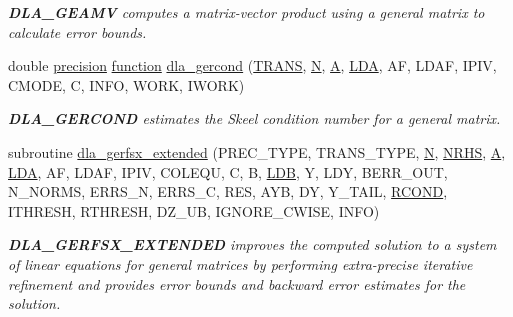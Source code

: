 \begin{DoxyCompactItemize}
\begin{DoxyCompactList}\small\item\em {\bfseries D\+L\+A\+\_\+\+G\+E\+A\+M\+V} computes a matrix-\/vector product using a general matrix to calculate error bounds. \end{DoxyCompactList}\item 
double \hyperlink{numinquire_8h_a2c8e616467665d0b2814d4c1589ba74e}{precision} \hyperlink{afunc_8m_a7b5e596df91eadea6c537c0825e894a7}{function} \hyperlink{group__doubleGEcomputational_ga5539077fbd3a92c4d92b75bf58da5db3}{dla\+\_\+gercond} (\hyperlink{superlu__enum__consts_8h_a0c4e17b2d5cea33f9991ccc6a6678d62a1f61e3015bfe0f0c2c3fda4c5a0cdf58}{T\+R\+A\+N\+S}, \hyperlink{polmisc_8c_a0240ac851181b84ac374872dc5434ee4}{N}, \hyperlink{classA}{A}, \hyperlink{example__user_8c_ae946da542ce0db94dced19b2ecefd1aa}{L\+D\+A}, A\+F, L\+D\+A\+F, I\+P\+I\+V, C\+M\+O\+D\+E, C, I\+N\+F\+O, W\+O\+R\+K, I\+W\+O\+R\+K)
\begin{DoxyCompactList}\small\item\em {\bfseries D\+L\+A\+\_\+\+G\+E\+R\+C\+O\+N\+D} estimates the Skeel condition number for a general matrix. \end{DoxyCompactList}\item 
subroutine \hyperlink{group__doubleGEcomputational_ga19c6e9e133a5ea3f59a24959889429f2}{dla\+\_\+gerfsx\+\_\+extended} (P\+R\+E\+C\+\_\+\+T\+Y\+P\+E, T\+R\+A\+N\+S\+\_\+\+T\+Y\+P\+E, \hyperlink{polmisc_8c_a0240ac851181b84ac374872dc5434ee4}{N}, \hyperlink{example__user_8c_aa0138da002ce2a90360df2f521eb3198}{N\+R\+H\+S}, \hyperlink{classA}{A}, \hyperlink{example__user_8c_ae946da542ce0db94dced19b2ecefd1aa}{L\+D\+A}, A\+F, L\+D\+A\+F, I\+P\+I\+V, C\+O\+L\+E\+Q\+U, C, B, \hyperlink{example__user_8c_a50e90a7104df172b5a89a06c47fcca04}{L\+D\+B}, Y, L\+D\+Y, B\+E\+R\+R\+\_\+\+O\+U\+T, N\+\_\+\+N\+O\+R\+M\+S, E\+R\+R\+S\+\_\+\+N, E\+R\+R\+S\+\_\+\+C, R\+E\+S, A\+Y\+B, D\+Y, Y\+\_\+\+T\+A\+I\+L, \hyperlink{superlu__enum__consts_8h_af00a42ecad444bbda75cde1b64bd7e72a9b5c151728d8512307565994c89919d5}{R\+C\+O\+N\+D}, I\+T\+H\+R\+E\+S\+H, R\+T\+H\+R\+E\+S\+H, D\+Z\+\_\+\+U\+B, I\+G\+N\+O\+R\+E\+\_\+\+C\+W\+I\+S\+E, I\+N\+F\+O)
\begin{DoxyCompactList}\small\item\em {\bfseries D\+L\+A\+\_\+\+G\+E\+R\+F\+S\+X\+\_\+\+E\+X\+T\+E\+N\+D\+E\+D} improves the computed solution to a system of linear equations for general matrices by performing extra-\/precise iterative refinement and provides error bounds and backward error estimates for the solution. \end{DoxyCompactList}\item 

\end{DoxyCompactItemize}

